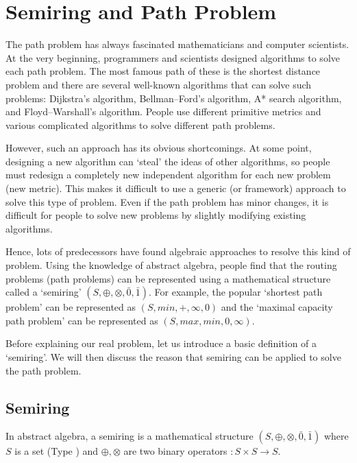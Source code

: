 \documentclass[a4paper,12pt,twoside,openright]{report}
\begin{document}
\section{Semiring and Path Problem}
The path problem has always fascinated mathematicians and computer scientists. 
At the very beginning, programmers and scientists designed algorithms to solve each path problem. 
The most famous path of these is the shortest distance problem and there are several well-known algorithms that can solve such problems: Dijkstra's algorithm, Bellman–Ford’s algorithm, A* search algorithm, and Floyd–Warshall’s algorithm. People use different primitive metrics and various complicated algorithms to solve different path problems.

However, such an approach has its obvious shortcomings. At some point, designing a new algorithm can ‘steal’ the ideas of other algorithms, so people must redesign a completely new independent algorithm for each new problem (new metric).  This makes it difficult to use a generic (or framework) approach to solve this type of problem. Even if the path problem has minor changes, it is difficult for people to solve new problems by slightly modifying existing algorithms. 

Hence, lots of predecessors have found algebraic approaches to resolve this kind of problem. 
Using the knowledge of abstract algebra, people find that the routing problems (path problems) can be represented using a mathematical structure called a ‘semiring’ $(S,\oplus,\otimes,\bar{0},\bar{1})$\cite{carre_algebra_1971,WONGSEELASHOTE197955,dynerowicz_forwarding_2013,mohri_semiring_2002,gurney_lexicographic_2007}. For example, the popular ‘shortest path problem’ can be represented as $(S, min,+,\infty,0)$\cite{mohri_semiring_2002} and the ‘maximal capacity path problem’ can be represented as $(S, max,min, 0, \infty)$. 

Before explaining our real problem, let us introduce a basic definition of a ‘semiring’. We will then discuss the reason that semiring can be applied to solve the path problem. 
\subsection{Semiring}
In abstract algebra, a semiring is a mathematical structure $(S,\oplus,\otimes,\bar0,\bar1)$ where $S$ is a set (Type ) and $\oplus,\otimes$ are two binary operators $:S\times S \rightarrow S$.
\end{document}
